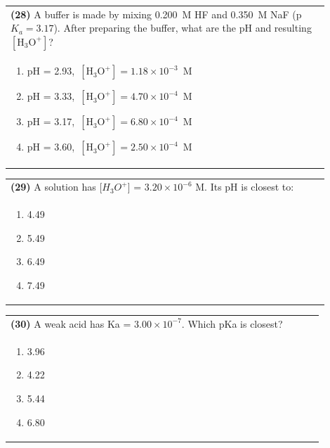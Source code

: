 \documentclass{article}
\begin{document}
\noindent\begin{tabular}{|p{0.9\linewidth}|}
\hline
\textbf{(28)} A buffer is made by mixing 0.200~M HF and 0.350~M NaF (p$K_a=3.17$). After preparing the buffer, what are the pH and resulting $[\mathrm{H_3O^+}]$?\\[0.2cm]
\begin{minipage}[t]{0.85\linewidth}
\begin{enumerate}[label=\alph*.]
\item pH = 2.93,\ $[\mathrm{H_3O^+}] = 1.18\times10^{-3}$~M
\item pH = 3.33,\ $[\mathrm{H_3O^+}] = 4.70\times10^{-4}$~M
\item pH = 3.17,\ $[\mathrm{H_3O^+}] = 6.80\times10^{-4}$~M
\item pH = 3.60,\ $[\mathrm{H_3O^+}] = 2.50\times10^{-4}$~M
\end{enumerate}
\end{minipage}\\[0.2cm]
\hline
\end{tabular}

\noindent\begin{tabular}{|p{0.9\linewidth}|}
\hline
\textbf{(29)} A solution has [$H_3O^+$] = $3.20\times10^{-6}$ M. Its pH is closest to: \\[0.2cm]
\begin{minipage}{0.85\linewidth}
\begin{enumerate}[label=\alph*.]
\item 4.49 \item 5.49 \item 6.49 \item 7.49
\end{enumerate}
\end{minipage}\\[0.2cm]
\hline
\end{tabular}

\noindent\begin{tabular}{|p{0.9\linewidth}|}
\hline
\textbf{(30)} A weak acid has Ka = $3.00\times10^{-7}$. Which pKa is closest? \\[0.2cm]
\begin{minipage}{0.85\linewidth}
\begin{enumerate}[label=\alph*.]
\item 3.96 \item 4.22 \item 5.44 \item 6.80
\end{enumerate}
\end{minipage}\\[0.2cm]
\hline
\end{tabular}
\end{document}

